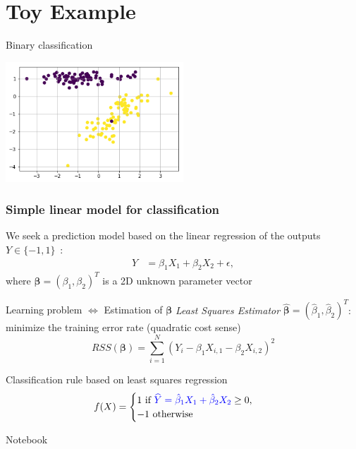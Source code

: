 \documentclass[pressentation,9pt,aspectratio=1610,xcolor=table]{beamer}
\newcommand{\structuretext}[1]{{\textcolor{blue}{#1}}}
\begin{document}
\section{Toy Example}

\begin{frame}{Binary classification}
  \begin{center}
    \includegraphics[width=0.5\textwidth]{academic_linear.png}
  \end{center}
\end{frame}

\begin{frame}
  \frametitle{Simple linear model for classification}
  We seek a prediction model based on the linear regression of the outputs
  $Y \in \{-1,1\}$~:
  \begin{align*}
    Y & = \beta_1 X_1 + \beta_2 X_2 + \epsilon,
  \end{align*}
  where $\boldsymbol{\beta}=(\beta_1, \beta_2)^T $ is a 2D unknown parameter vector

  \begin{block}{Learning problem $\Leftrightarrow$ Estimation of $\boldsymbol{\beta}$}
    {\it Least Squares Estimator} $\hat{\boldsymbol{\beta}}=(\hat{\beta}_1, \hat{\beta}_2)^T $:
    minimize the training error rate (quadratic cost sense)
    $$
    RSS ( \boldsymbol{\beta} )= \sum_{i=1}^N (Y_i - \beta_1 X_{i,1} - \beta_2 X_{i,2} )^2
    $$
  \end{block}


  \begin{block}{Classification rule based on least squares regression}
    \vspace{-2mm}
    \begin{align*}
      f(X) &= \begin{cases}
        1\text{ if } \structuretext{\widehat{Y}= \hat{\beta}_1 X_1 + \hat{\beta}_2 X_2} \ge 0,\\
        -1 \text{ otherwise}
      \end{cases}
    \end{align*}
  \end{block}

  \alert{Notebook}
\end{frame}
\end{document}
